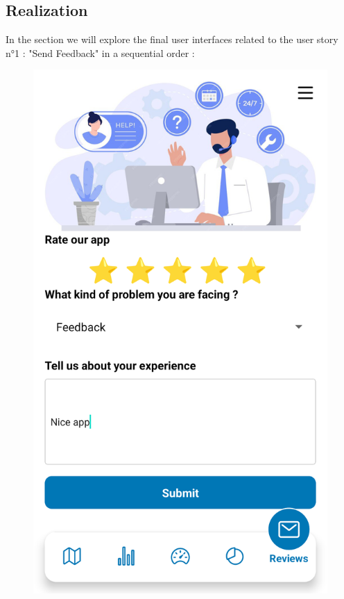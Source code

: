 \subsection{Realization}
In the section we will explore the final user interfaces related to the user story n°1 : "Send Feedback" in a sequential order :
\begin{figure}[H]
\begin{minipage}{0.32\textwidth}
    \centering
    \includegraphics[width=\linewidth]{images/sprint4/feedBackModule (6).png}

\end{minipage}
\end{figure}
